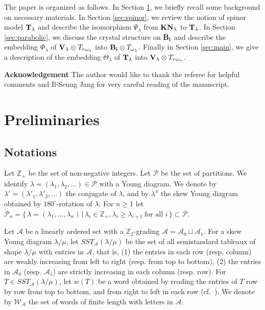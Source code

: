 \documentclass[leqno,11pt]{amsart}
\numberwithin{equation}{section}
\newcommand{\bs}{\boldsymbol}
\newcommand{\A}{\mathcal{A}}
\newcommand{\B}{\mathbf{B}}
\newcommand{\W}{\mathcal{W}}
\newcommand{\cP}{\mathscr{P}}
\newcommand{\bi}{\bs{\rm i}}
\newcommand{\Z}{\mathbb{Z}}
\newcommand{\mc}{\mathcal}
\newcommand{\la}{\lambda}
\begin{document}

The paper is organized as follows. In Section \ref{sec:prel}, we briefly recall some background on necessary materials. In Section \ref{sec:spinor}, we review the notion of spinor model ${\bf T}_\la$ and describe the isomorphism $\Psi_\la$ from ${\bf KN}_\la$ to ${\bf T}_\la$. In Section \ref{sec:parabolic}, we discuss the crystal structure on $\B_{\bi}$ and
describe the embedding $\Phi_\la$ of ${\bf V}_\la\otimes T_{r\omega_n}$ into $\B_{\bi}\otimes T_{\omega_\la}$. Finally in Section \ref{sec:main}, we give a description of the embedding $\Theta_\la$ of ${\bf T}_\la$ into ${\bf V}_\la\otimes T_{r\omega_n}$.\vskip 2mm

{\bf Acknowledgement} The author would like to thank the referee for helpful comments and Il-Seung Jang for very careful reading of the manuscript.

\section{Preliminaries}\label{sec:prel}
\subsection{Notations}
Let $\Z_+$ be the set of non-negative integers.
Let $\mathscr{P}$ be the set of partitions. 
We identify $\lambda=(\la_1,\la_2,\ldots)\in \cP$ with a {Young diagram}. We denote by $\la'=(\la'_1,\la'_2,\ldots)$ the conjugate of $\la$, and by $\lambda^\pi$ the skew Young diagram obtained by $180^{\circ}$-rotation of $\lambda$. For $n\geq 1$ let $\cP_n=\{\,\la=(\la_1,\ldots,\la_n)\,|\,\la_i\in \Z_+, \la_i\geq \la_{i+1}\ \text{for all $i$}\,\}\subset \cP$.

Let $\mc{A}$ be a linearly ordered  set with a $\mathbb{Z}_2$-grading $\mc{A}=\mc{A}_0\sqcup\mc{A}_1$. For a skew Young diagram
$\lambda/\mu$, let $SST_\A(\lambda/\mu)$ be the set of all
semistandard tableaux of shape $\lambda/\mu$ with entries in $\A$, that is, (1) the entries in each row (resp. column) are
weakly increasing from left to right (resp. from top to bottom), (2)
the entries in $\mc{A}_0$ (resp. $\mc{A}_1$) are strictly increasing in each
column (resp. row).
For $T\in SST_\A(\lambda/\mu)$, let $w(T)$ be a word obtained by reading the entries of $T$ row
by row from top to bottom, and from right to left in each row (cf.~\cite{Ful}).
We denote by $\W_\A$ the set of words of finite length with letters in $\A$.
\end{document}
